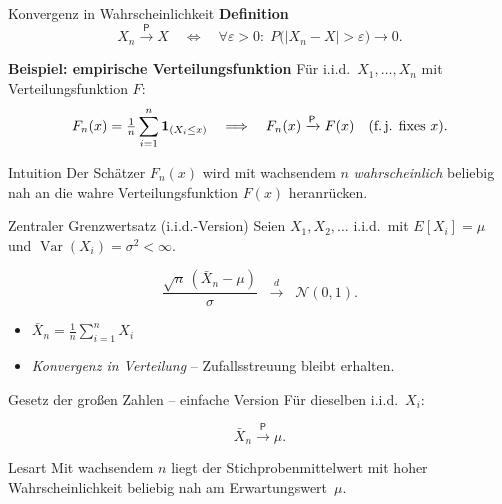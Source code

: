 \documentclass[aspectratio=169]{beamer}
\begin{document}
\begin{frame}{Konvergenz in Wahrscheinlichkeit}
\small
\textbf{Definition}  
\[
X_n \xrightarrow{\mathsf P} X
\quad\Longleftrightarrow\quad
\forall\varepsilon>0:\;
P\bigl(|X_n-X|>\varepsilon\bigr)\longrightarrow 0.
\]

\medskip
\textbf{Beispiel: empirische Verteilungsfunktion}  
Für i.i.d.\ $X_1,\dots,X_n$ mit Verteilungsfunktion $F$:
\[
F_n(x)=\tfrac1n\sum_{i=1}^n\mathbf1_{(X_i\le x)}
\quad\Longrightarrow\quad
F_n(x)\xrightarrow{\mathsf P}F(x)\quad(\text{f.\,j. fixes }x).
\]

\begin{block}{Intuition}
Der Schätzer $F_n(x)$ wird mit wachsendem $n$ \emph{wahrscheinlich} beliebig nah an die wahre Verteilungsfunktion $F(x)$ heranrücken.
\end{block}
\end{frame}

\begin{frame}{Zentraler Grenzwertsatz (i.i.d.-Version)}
\small
Seien $X_1,X_2,\dots$ i.i.d.\ mit $E[X_i]=\mu$ und $\operatorname{Var}(X_i)=\sigma^2<\infty$.

\[
\frac{\sqrt n\,(\bar X_n-\mu)}{\sigma}
\;\;\xrightarrow{\;d\;}\;\;
\mathcal N(0,1).
\]

\begin{itemize}
  \item $\bar X_n=\tfrac1n\sum_{i=1}^n X_i$  
  \item \emph{Konvergenz in Verteilung} – Zufallsstreuung bleibt erhalten.
\end{itemize}
\end{frame}

\begin{frame}{Gesetz der großen Zahlen – einfache Version}
\small
Für dieselben i.i.d.\ $X_i$:

\[
\bar X_n \xrightarrow{\mathsf P} \mu.
\]

\begin{block}{Lesart}
Mit wachsendem $n$ liegt der Stich­proben­mittelwert mit hoher Wahrscheinlichkeit beliebig nah am Erwartungswert~$\mu$.
\end{block}
\end{frame}
\end{document}
